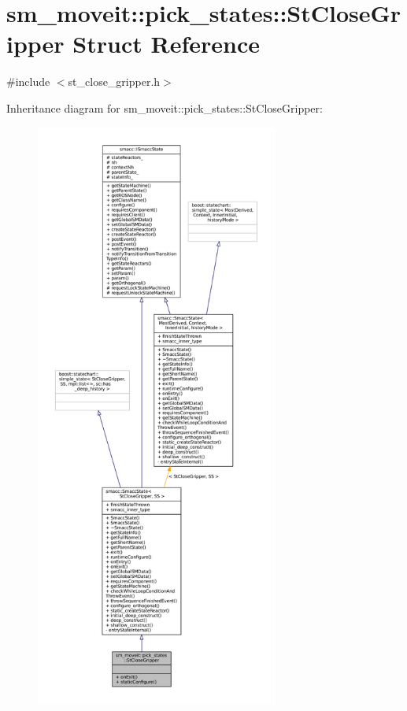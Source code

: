 \hypertarget{structsm__moveit_1_1pick__states_1_1StCloseGripper}{}\section{sm\+\_\+moveit\+:\+:pick\+\_\+states\+:\+:St\+Close\+Gripper Struct Reference}
\label{structsm__moveit_1_1pick__states_1_1StCloseGripper}


{\ttfamily \#include $<$st\+\_\+close\+\_\+gripper.\+h$>$}



Inheritance diagram for sm\+\_\+moveit\+:\+:pick\+\_\+states\+:\+:St\+Close\+Gripper\+:
\nopagebreak
\begin{figure}[H]
\begin{center}
\leavevmode
\includegraphics[height=550pt]{structsm__moveit_1_1pick__states_1_1StCloseGripper__inherit__graph}
\end{center}
\end{figure}



